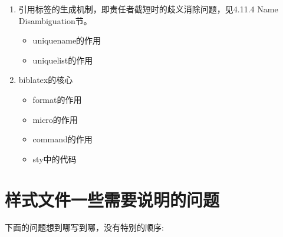 \begin{enumerate}
  \item 引用标签的生成机制，即责任者截短时的歧义消除问题，见4.11.4 Name Disambiguation节。
  \begin{itemize}
    \item uniquename的作用
    \item uniquelist的作用
  \end{itemize}

  \item biblatex的核心
  \begin{itemize}
    \item format的作用
    \item micro的作用
    \item command的作用
    \item sty中的代码
  \end{itemize}
\end{enumerate}

\section{样式文件一些需要说明的问题}
下面的问题想到哪写到哪，没有特别的顺序:

